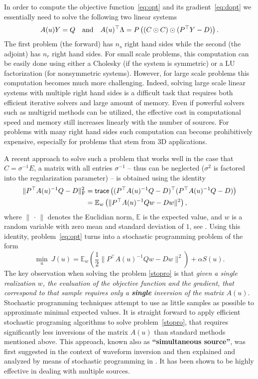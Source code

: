 \documentclass[12pt]{article}
\newcommand{\hf}{\frac12}
\newcommand{\bbE}{\mathbb{E}}
\begin{document}
In order to compute the objective function~\eqref{eq:opt} and its gradient~\eqref{eq:dopt} we essentially need to solve the following two linear systems
$$ A(u)Y = Q \quad {\rm and} \quad A(u)^{\top} \Lambda = P\left((C \odot C) \odot (P^{\top}Y - D) \right).$$
The first problem (the forward) has $n_{s}$ right hand sides while the second (the adjoint) has $n_r$ right hand sides. For small scale problems, this computation can be easily done using either a Cholesky (if the system is symmetric) or a LU factorization (for nonsymmetric systems). However, for large scale problems this computation becomes much more challenging. Indeed, solving large scale linear systems with multiple right hand sides is a difficult task that requires both efficient iterative solvers and large amount of memory. Even if powerful solvers such as multigrid methods can be utilized, the effective cost in computational speed and memory still increases linearly with the number of sources. For problems with many right hand sides such computation can become prohibitively expensive, especially for problems that stem from 3D applications.

\bigskip

A recent approach to solve such a problem that works well in the case that $C=\sigma^{-1}E$, a matrix with all entries $\sigma^{-1}$ -- thus can be neglected ($\sigma^2$ is factored into the regularization parameter) -- is obtained using the identity
\begin{align*}
	 \|P^{\top}A(u)^{-1}Q - D\|_{\rm F}^{2} &= {\sf trace}\left((P^{\top}A(u)^{-1}Q - D)^{\top}(P^{\top}A(u)^{-1}Q - D)\right) \\
	&= \bbE_{w} \left( \|P^{\top}A(u)^{-1}Qw - Dw\|^{2} \right),
\end{align*}
where $\| \, \cdot \, \|$ denotes the Euclidian norm, $\bbE$ is the expected value, and $w$ is a random variable with zero mean and standard deviation of $1$, see \cite{HaberChungHerrmann2011}. Using this identity, problem~\eqref{eq:opt} turns into a stochastic programming problem of the form
\begin{equation}
\label{stopro}
\min_{u} \ J(u) = \bbE_{w}\left(\hf \|P^{\top}A(u)^{-1}Qw - Dw\|^{2}\right) + \alpha S(u).
\end{equation}
The key observation when solving the problem \eqref{stopro} is that {\em given a single realization $w$, the evaluation of the objective function and the gradient, that correspond to that sample requires only a {\bf single} inversion of the matrix $A(u)$}.
Stochastic programming techniques attempt to use as little samples as possible to approximate minimal expected values. It is straight forward to apply efficient stochastic programing algorithms to solve problem~\eqref{stopro}, that requires significantly less inversions of the matrix $A(u)$ than standard methods mentioned above.
This approach, known also as {\bf``simultaneous source''}, was first suggested in the context of waveform inversion \cite{RohmbergGeop2010,krebs09ffw,neelamani08dos,LeeuwenAravkinHerrmann2011} and then explained and analyzed by means of stochastic programming in \cite{HaberChungHerrmann2011}. It has been shown to be highly effective in dealing with multiple sources.
\end{document}
